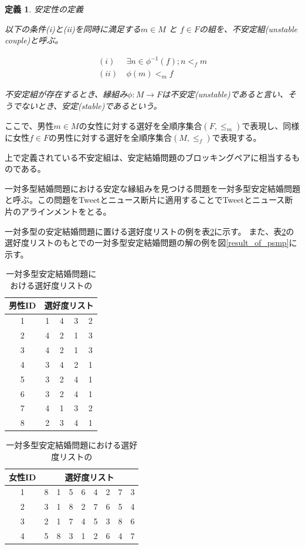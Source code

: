 \documentclass[12pt]{jarticle}
\newtheorem{definittion}{定義}[section]
\begin{document}
\begin{definittion}
\label{psmp_def_2}
安定性の定義

以下の条件(i)と(ii)を同時に満足する$m \in M$ と $f \in F$の組を、不安定組(unstable couple)と呼ぶ。

\begin{align}
(i) &\  \exists n \in \phi ^{-1} (f); n <_f m \\
(ii) &\  \phi(m) <_m f
\end{align}

不安定組が存在するとき、縁組み$\phi: M \rightarrow F$は不安定(unstable)であると言い、そうでないとき、安定(stable)であるという。
\end{definittion}

ここで、男性$m \in M$の女性に対する選好を全順序集合$(F, \leq _m)$で表現し、同様に女性$f \in F$の男性に対する選好を全順序集合$(M, \leq _f)$で表現する。

上で定義されている不安定組は、安定結婚問題のブロッキングペアに相当するものである。

一対多型結婚問題における安定な縁組みを見つける問題を一対多型安定結婚問題と呼ぶ。この問題をTweetとニュース断片に適用することでTweetとニュース断片のアラインメントをとる。

一対多型の安定結婚問題に置ける選好度リストの例を表\ref{psmp_table}に示す。
また、表\ref{psmp_table}の選好度リストのもとでの一対多型安定結婚問題の解の例を図\ref{result_of_psmp}に示す。

\begin{table}
\begin{center}
\caption{一対多型安定結婚問題における選好度リストの}
\label{psmp_table}
\begin{tabular}[t]{|c||c|c|c|c|}
\hline
男性ID & \multicolumn{4}{|c|}{選好度リスト} \\ \hline \hline
1 & 1 & 4 & 3 & 2 \\ \hline
2 & 4 & 2 & 1 & 3 \\ \hline
3 & 4 & 2 & 1 & 3 \\ \hline
4 & 3 & 4 & 2 & 1 \\ \hline
5 & 3 & 2 & 4 & 1 \\ \hline
6 & 3 & 2 & 4 & 1 \\ \hline
7 & 4 & 1 & 3 & 2 \\ \hline
8 & 2 & 3 & 4 & 1 \\ \hline
\end{tabular}
\begin{tabular}[t]{|c||c|c|c|c|c|c|c|c|}
\hline
女性ID & \multicolumn{8}{|c|}{選好度リスト} \\ \hline \hline
1 & 8 & 1 & 5 & 6 & 4 & 2 & 7 & 3 \\ \hline
2 & 3 & 1 & 8 & 2 & 7 & 6 & 5 & 4 \\ \hline
3 & 2 & 1 & 7 & 4 & 5 & 3 & 8 & 6 \\ \hline
4 & 5 & 8 & 3 & 1 & 2 & 6 & 4 & 7 \\ \hline
\end{tabular}
\end{center}
\end{table}
\end{document}
